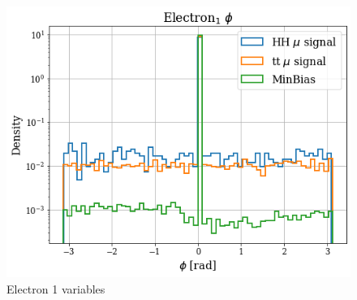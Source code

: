 \documentclass[../main.tex]{subfiles}
\begin{document}
\begin{figure}[!ht]
\begin{minipage}[b]{0.33\linewidth}
    \centering
    \includegraphics[width=1\linewidth]{Chapters/Plots/Hist_1mu_electron1_Phi.png}
  \end{minipage}
  \caption{Electron 1 variables}
\end{figure}
\end{document}
